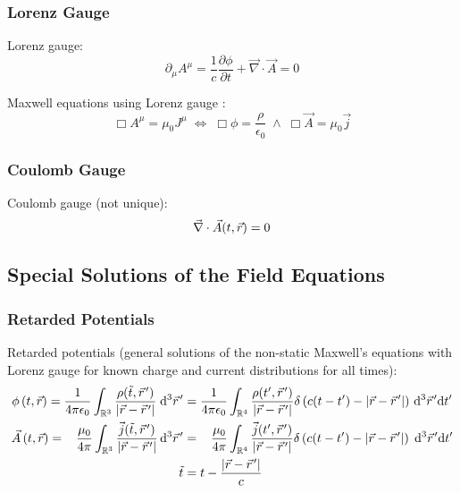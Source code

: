 		\subsubsection{Lorenz Gauge}
			\noindent
			Lorenz gauge:
			\begin{equation}
				\partial_\mu A^\mu = \frac{1}{c}\frac{\partial \phi}{\partial t} + \vec{\nabla}\cdot\vec{A} = 0
			\end{equation}

			\noindent
			Maxwell equations using Lorenz gauge :
			\begin{equation}
				\Box A^\mu = \mu_0 J^\mu \;\Leftrightarrow\;
				\Box \phi = \dfrac{\rho}{\epsilon_0} \;\wedge\;
				\Box \vec{A} = \mu_0 \vec{j}
			\end{equation}

		\subsubsection{Coulomb Gauge }
			\noindent
			Coulomb gauge (not unique):
			\begin{equation}
				\vec{\nabla}\cdot\vec{A}(t,\vec{r})=0
			\end{equation}

	\subsection{Special Solutions of the Field Equations}
		\subsubsection{Retarded Potentials}
			\label{Sec:RetardedPotentials}
			\noindent
			Retarded potentials (general solutions of the non-static Maxwell's equations with Lorenz gauge for known charge and current distributions for all times):
			\begin{equation}
				\begin{aligned}
					\phi\left(t,\vec{r}\right)
					= \frac{1}{4\pi\epsilon_0} \int_{\mathbb{R}^3} \frac{\rho(\tilde{t},\pvec{r}')}{\left|\vec{r}-\pvec{r}'\right|}\;\dd^3 \pvec{r}'
					&=	\frac{1}{4\pi\epsilon_0} \int_{\mathbb{R}^4} \frac{\rho(t',\pvec{r}')}{\left|\vec{r}-\pvec{r}'\right|}\delta\left( c(t-t')-\left|\vec{r}-\pvec{r}'\right|\right)\,\dd^3 \pvec{r}'\dd t' \\
					\vec{A}\left(t,\vec{r}\right)
					= \phantom{\epsilon_0} \frac{\mu_0}{4\pi} \int_{\mathbb{R}^3} \frac{\vec{j}(\tilde{t},\pvec{r}')}{\left|\vec{r}-\pvec{r}'\right|}\,\dd^3 \pvec{r}'
					&=	\phantom{\epsilon_0} \frac{\mu_0}{4\pi} \int_{\mathbb{R}^4} \frac{\vec{j}(t',\pvec{r}')}{\left|\vec{r}-\pvec{r}'\right|}\delta\left( c(t-t')-\left|\vec{r}-\pvec{r}'\right|\right)\;\dd^3 \pvec{r}'\dd t' \\
					\tilde{t}&=t-\frac{\left|\vec{r}-\pvec{r}'\right|}{c}
				\end{aligned}
			\end{equation}

